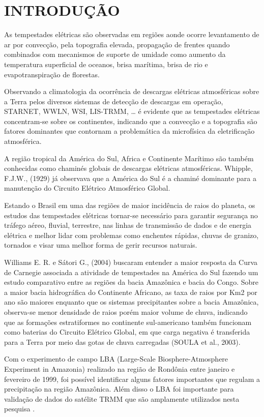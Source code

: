\chapter{INTRODUÇÃO}


As tempestades elétricas 	são observadas em regiões aonde ocorre levantamento de ar por convecção, pela topografia elevada, propagação de frentes quando combinados com mecanismos de suporte de umidade como aumento da temperatura superficial de oceanos, brisa marítima, brisa de rio e evapotranspiração de florestas.

Observando a climatologia da ocorrência de descargas elétricas atmosféricas sobre a Terra pelos diversos sistemas de detecção de descargas em operação, STARNET, WWLN, WSI, LIS-TRMM, … é evidente que as tempestades elétricas concentram-se sobre os continentes, indicando que a convecção e a topografia são fatores dominantes que contornam a problemática da microfísica da eletrificação atmosférica.

A região tropical da América do Sul, Africa e Continente Marítimo são também conhecidas como chaminés globais de descargas elétricas atmosféricas. Whipple, F.J.W., (1929) já observava que a América do Sul é a chaminé dominante para a manutenção do Circuito Elétrico Atmosférico Global. 

Estando o Brasil em uma das regiões de maior incidência de raios do planeta, os estudos das tempestades elétricas tornar-se necessário para garantir segurança no tráfego aéreo, fluvial, terrestre, nas linhas de transmissão de dados e de energia elétrica e melhor lidar com problemas como enchentes rápidas, chuvas de granizo, tornados e visar uma melhor forma de gerir recursos naturais.

Williams E. R. e Sátori G., (2004) buscaram entender a maior resposta da Curva de Carnegie associada a atividade de tempestades na América do Sul fazendo um estudo comparativo entre as regiões da bacia Amazônica e bacia do Congo. Sobre a maior bacia hidrográfica do Continente Africano, as taxa de raios por Km2 por ano são maiores enquanto que os sistemas precipitantes sobre a bacia Amazônica, observa-se menor densidade de raios porém maior volume de chuva, indicando que as formações estratiformes no continente sul-americano também funcionam como baterias do Circuito Elétrico Global, em que carga negativa é transferida para a Terra por meio das gotas de chuva carregadas (SOULA et al., 2003).

Com o experimento de campo LBA (Large-Scale Biosphere-Atmosphere Experiment in Amazonia) realizado na região de Rondônia entre janeiro e fevereiro de 1999, foi possível identificar alguns fatores importantes que regulam a precipitação na região Amazônica. Além disso o LBA foi importante para validação de dados do satélite TRMM que são amplamente utilizados nesta pesquisa \cite{TRMM LBA papers}.

